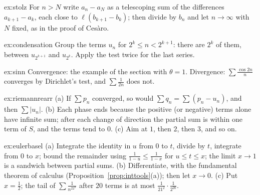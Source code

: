 \begin{hint}{ex:stolz}
For $n>N$ write $a_n-a_N$ as a telescoping sum of the differences $a_{k+1}-a_k$, each close to $\ell(b_{k+1}-b_k)$; then divide by $b_n$ and let $n\to\infty$ with $N$ fixed, as in the proof of Ces\`aro.
\end{hint}
\begin{hint}{ex:condensation}
Group the terms $u_n$ for $2^k\le n<2^{k+1}$: there are $2^k$ of them, between $u_{2^{k+1}}$ and $u_{2^k}$. Apply the test twice for the last series.
\end{hint}
\begin{hint}{ex:sinn}
Convergence: the example of the section with $\theta=1$. Divergence: $\sum\frac{\cos2n}n$ converges by Dirichlet's test, and $\sum\frac1{2n}$ does not.
\end{hint}
\begin{hint}{ex:riemannrearr}
(a) If $\sum p_n$ converged, so would $\sum q_n=\sum(p_n-u_n)$, and then $\sum|u_n|$. (b) Each phase ends because the positive (or negative) terms alone have infinite sum; after each change of direction the partial sum is within one term of $S$, and the terms tend to $0$. (c) Aim at $1$, then $2$, then $3$, and so on.
\end{hint}
\begin{hint}{ex:eulerbasel}
(a) Integrate the identity in $u$ from $0$ to $t$, divide by $t$, integrate from $0$ to $x$; bound the remainder using $\frac1{1-u}\le\frac1{1-x}$ for $u\le t\le x$; the limit $x\to1$ is a sandwich between partial sums. (b) Differentiate, with the fundamental theorem of calculus (Proposition~\ref{prop:inttools}(a)); then let $x\to0$. (c) Put $x=\frac12$; the tail of $\sum\frac1{n^22^n}$ after $20$ terms is at most $\frac1{21^2}\cdot\frac1{2^{20}}$.
\end{hint}

